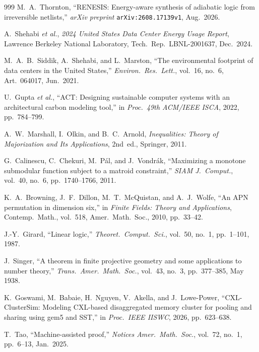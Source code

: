 \documentclass[11pt,letterpaper]{article}
\theoremstyle{spectralthm}
\begin{document}
\begin{thebibliography}{999}
M.~A.~Thornton, ``RENESIS: Energy-aware synthesis of adiabatic logic from irreversible netlists,'' \textit{arXiv preprint} \texttt{arXiv:2608.17139v1}, Aug.\ 2026.

A.~Shehabi \textit{et al.}, \textit{2024 United States Data Center Energy Usage Report}, Lawrence Berkeley National Laboratory, Tech.\ Rep.\ LBNL-2001637, Dec.\ 2024.

M.~A.~B.~Siddik, A.~Shehabi, and L.~Marston, ``The environmental footprint of data centers in the United States,'' \textit{Environ.\ Res.\ Lett.}, vol.~16, no.~6, Art.~064017, Jun.\ 2021.

U.~Gupta \textit{et al.}, ``ACT: Designing sustainable computer systems with an architectural carbon modeling tool,'' in \textit{Proc.\ 49th ACM/IEEE ISCA}, 2022, pp.~784--799.

A.~W.~Marshall, I.~Olkin, and B.~C.~Arnold, \textit{Inequalities: Theory of Majorization and Its Applications}, 2nd~ed., Springer, 2011.

G.~Calinescu, C.~Chekuri, M.~P\'{a}l, and J.~Vondr\'{a}k, ``Maximizing a monotone submodular function subject to a matroid constraint,'' \textit{SIAM J.\ Comput.}, vol.~40, no.~6, pp.~1740--1766, 2011.

K.~A.~Browning, J.~F.~Dillon, M.~T.~McQuistan, and A.~J.~Wolfe, ``An APN permutation in dimension six,'' in \textit{Finite Fields: Theory and Applications}, Contemp.\ Math., vol.~518, Amer.\ Math.\ Soc., 2010, pp.~33--42.

J.-Y.~Girard, ``Linear logic,'' \textit{Theoret.\ Comput.\ Sci.}, vol.~50, no.~1, pp.~1--101, 1987.

J.~Singer, ``A theorem in finite projective geometry and some applications to number theory,'' \textit{Trans.\ Amer.\ Math.\ Soc.}, vol.~43, no.~3, pp.~377--385, May 1938.

K.~Goswami, M.~Babaie, H.~Nguyen, V.~Akella, and J.~Lowe-Power, ``CXL-ClusterSim: Modeling CXL-based disaggregated memory cluster for pooling and sharing using gem5 and SST,'' in \textit{Proc.\ IEEE IISWC}, 2026, pp.~623--638.

T.~Tao, ``Machine-assisted proof,'' \textit{Notices Amer.\ Math.\ Soc.}, vol.~72, no.~1, pp.~6--13, Jan.\ 2025.


\end{thebibliography}
\end{document}
